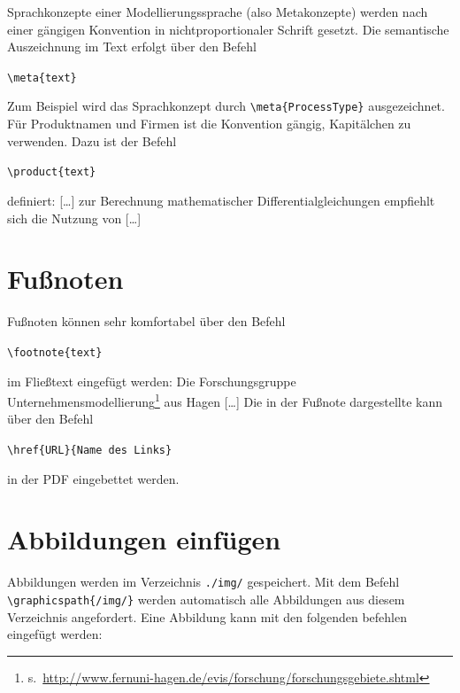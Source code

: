 Sprachkonzepte einer Modellierungssprache (also Metakonzepte) werden nach einer gängigen Konvention in nichtproportionaler Schrift gesetzt. Die semantische Auszeichnung im Text erfolgt über den Befehl 

\begin{syntax}
\verb|\meta{text}|
\end{syntax} 

Zum Beispiel wird das Sprachkonzept   durch \verb|\meta{ProcessType}| ausgezeichnet.
%
%
Für Produktnamen und Firmen ist die Konvention gängig, Kapitälchen zu verwenden. Dazu ist der Befehl

\begin{syntax}
\verb|\product{text}|
\end{syntax} 

definiert: [\ldots] zur Berechnung mathematischer Differentialgleichungen empfiehlt sich die Nutzung von  [\ldots] 

\section{Fußnoten}
\label{sec:fussnoten}

Fußnoten können sehr komfortabel über den Befehl 

\begin{syntax}
\verb|\footnote{text}|
\end{syntax} 

im Fließtext eingefügt werden:
Die Forschungsgruppe Unternehmensmodellierung\footnote{s.~\url{http://www.fernuni-hagen.de/evis/forschung/forschungsgebiete.shtml}} aus Hagen [\ldots]
Die in der Fußnote dargestellte  kann über den Befehl

\begin{syntax}
	\verb|\href{URL}{Name des Links}|
\end{syntax}

in der PDF eingebettet werden.

\section{Abbildungen einfügen}
\label{sec:abbildungen}

Abbildungen werden im Verzeichnis \verb|./img/| gespeichert. Mit dem Befehl \verb|\graphicspath{/img/}| werden automatisch alle Abbildungen aus diesem Verzeichnis angefordert. Eine Abbildung kann mit den folgenden befehlen eingefügt werden:

